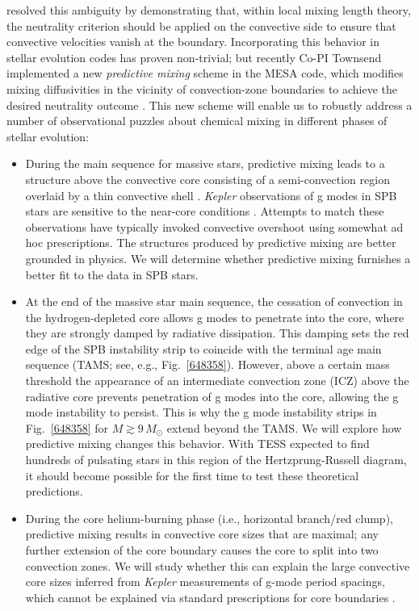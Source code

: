 \citet{Gabriel:2014} resolved this ambiguity by demonstrating that, within local mixing length theory, the neutrality criterion should be applied on the convective side to ensure that convective velocities vanish at the boundary. Incorporating this behavior in stellar evolution codes has proven non-trivial; but recently Co-PI Townsend implemented a new \emph{predictive mixing} scheme in the MESA code, which modifies mixing diffusivities in the vicinity of convection-zone boundaries to achieve the desired neutrality outcome \citep[see][]{Paxton:2017}. This new scheme will enable us to robustly address a number of observational puzzles about chemical mixing in different phases of stellar evolution:
\begin{itemize}

\item During the main sequence for massive stars, predictive mixing leads to a structure above the convective core consisting of a semi-convection region overlaid by a thin convective shell \citep[see, e.g., the right-hand panel in Fig.~4 of][]{Paxton:2017}. \emph{Kepler} observations of g modes in SPB stars are sensitive to the near-core conditions \citep[e.g.,][]{Moravveji:2015}.  Attempts to match these observations have typically invoked convective overshoot using somewhat ad hoc prescriptions.    The structures produced by predictive mixing are better grounded in physics. We will determine whether predictive mixing furnishes a better fit to the data in SPB stars.

\item At the end of the massive star main sequence, the cessation of convection in the hydrogen-depleted core allows g modes to penetrate into the core, where they are strongly damped by radiative dissipation. This damping sets the red edge of the SPB instability strip to coincide with the terminal age main sequence (TAMS; see, e.g., Fig.~\ref{648358}). However, above a certain mass threshold the appearance of an intermediate convection zone (ICZ) above the radiative core prevents penetration of g modes into the core, allowing the g mode instability to persist. This is why the g mode instability strips in Fig.~\ref{648358} for $M \! \gtrsim \! 9\,M_{\odot}$ extend beyond the TAMS. We will explore how predictive mixing changes this behavior. With TESS expected to find hundreds of pulsating stars in this region of the Hertzprung-Russell diagram, it should become possible for the first time to test these theoretical predictions.

\item During the core helium-burning phase (i.e., horizontal branch/red clump), predictive mixing results in convective core sizes that are maximal; any further extension of the core boundary causes the core to split into two convection zones. We will study whether this can explain the large convective core sizes inferred from \emph{Kepler} measurements of g-mode period spacings, which cannot be explained via standard prescriptions for core boundaries \citep[e.g.,][and reference therein]{Constantino:2015}.

\end{itemize}